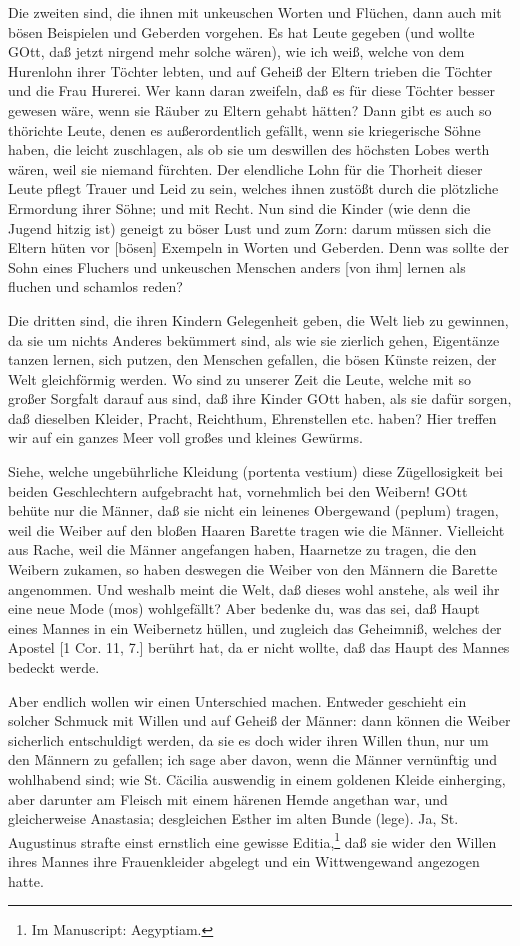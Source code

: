 Die zweiten sind, die ihnen mit unkeuschen Worten und Flüchen, dann auch mit bösen Beispielen und Geberden vorgehen. Es hat Leute gegeben (und wollte GOtt, daß jetzt nirgend mehr solche wären), wie ich weiß, welche von dem Hurenlohn ihrer Töchter lebten, und auf Geheiß der Eltern trieben die Töchter und die Frau Hurerei. Wer kann daran zweifeln, daß es für diese Töchter besser gewesen wäre, wenn sie Räuber zu Eltern gehabt hätten? Dann gibt es auch so thörichte Leute, denen es außerordentlich gefällt, wenn sie kriegerische Söhne haben, die leicht zuschlagen, als ob sie um deswillen des höchsten Lobes werth wären, weil sie niemand fürchten. Der elendliche Lohn für die Thorheit dieser Leute pflegt Trauer und Leid zu sein, welches ihnen zustößt durch die plötzliche Ermordung ihrer Söhne; und mit Recht. Nun sind die Kinder (wie denn die Jugend hitzig ist) geneigt zu böser Lust und zum Zorn: darum müssen sich die Eltern hüten vor [bösen] Exempeln in Worten und Geberden. Denn was sollte der Sohn eines Fluchers und unkeuschen Menschen anders [von ihm] lernen als fluchen und schamlos reden?

Die dritten sind, die ihren Kindern Gelegenheit geben, die Welt lieb zu gewinnen, da sie um nichts Anderes bekümmert sind, als wie sie zierlich gehen, Eigentänze tanzen lernen, sich putzen, den Menschen gefallen, die bösen Künste reizen, der Welt gleichförmig werden. Wo sind zu unserer Zeit die Leute, welche mit so großer Sorgfalt darauf aus sind, daß ihre Kinder GOtt haben, als sie dafür sorgen, daß dieselben Kleider, Pracht, Reichthum, Ehrenstellen etc. haben? Hier treffen wir auf ein ganzes Meer voll großes und kleines Gewürms.

Siehe, welche ungebührliche Kleidung (portenta vestium) diese Zügellosigkeit bei beiden Geschlechtern aufgebracht hat, vornehmlich bei den Weibern! GOtt behüte nur die Männer, daß sie nicht ein leinenes Obergewand (peplum) tragen, weil die Weiber auf den bloßen Haaren Barette tragen wie die Männer. Vielleicht aus Rache, weil die Männer angefangen haben, Haarnetze zu tragen, die den Weibern zukamen, so haben deswegen die Weiber von den Männern die Barette angenommen. Und weshalb meint die Welt, daß dieses wohl anstehe, als weil ihr eine neue Mode (mos) wohlgefällt? Aber bedenke du, was das sei, daß Haupt eines Mannes in ein Weibernetz hüllen, und zugleich das Geheimniß, welches der Apostel [1 Cor. 11, 7.] berührt hat, da er nicht wollte, daß das Haupt des Mannes bedeckt werde.

Aber endlich wollen wir einen Unterschied machen. Entweder geschieht ein solcher Schmuck mit Willen und auf Geheiß der Männer: dann können die Weiber sicherlich entschuldigt werden, da sie es doch wider ihren Willen thun, nur um den Männern zu gefallen; ich sage aber davon, wenn die Männer vernünftig und wohlhabend
sind; wie St. Cäcilia auswendig in einem goldenen Kleide einherging, aber darunter am Fleisch mit einem härenen Hemde angethan war, und gleicherweise Anastasia; desgleichen Esther im alten Bunde (lege). Ja, St. Augustinus strafte einst ernstlich eine gewisse Editia,\footnote{Im Manuscript: Aegyptiam.} daß sie wider den Willen ihres Mannes ihre Frauenkleider abgelegt und ein Wittwengewand angezogen hatte.

